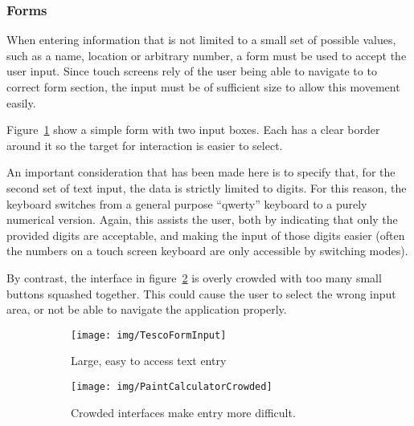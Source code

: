 
\subsubsection{Forms}
\label{ssub:forms}

When entering information that is not limited to a small set of possible
values, such as a name, location or arbitrary number, a form must be used to
accept the user input. Since touch screens rely of the user being able to
navigate to to correct form section, the input must be of sufficient size to
allow this movement easily.

Figure~\ref{fig:TescoFormInput} show a simple form with two input boxes. Each
has a clear border around it so the target for interaction is easier to select.

An important consideration that has been made here is to specify that, for the
second set of text input, the data is strictly limited to digits. For this
reason, the keyboard switches from a general purpose ``qwerty'' keyboard to a
purely numerical version. Again, this assists the user, both by indicating that
only the provided digits are acceptable, and making the input of those digits
easier (often the numbers on a touch screen keyboard are only accessible by
switching modes).

By contrast, the interface in figure~\ref{fig:PaintCalculatorCrowded} is overly
crowded with too many small buttons squashed together. This could cause the
user to select the wrong input area, or not be able to navigate the application
properly.

\begin{figure}[ht]
    \centering
    \begin{subfigure}[b]{0.25\textwidth}
        \texttt{[image: img/TescoFormInput]}
        \caption{Large, easy to access text entry}\label{fig:TescoFormInput}
    \end{subfigure}%
    \qquad
    \begin{subfigure}[b]{0.3\textwidth}
        \texttt{[image: img/PaintCalculatorCrowded]}
        \caption{Crowded interfaces make entry more difficult.}
    \end{subfigure}
    \caption{}\label{fig:PaintCalculatorCrowded}
\end{figure}



